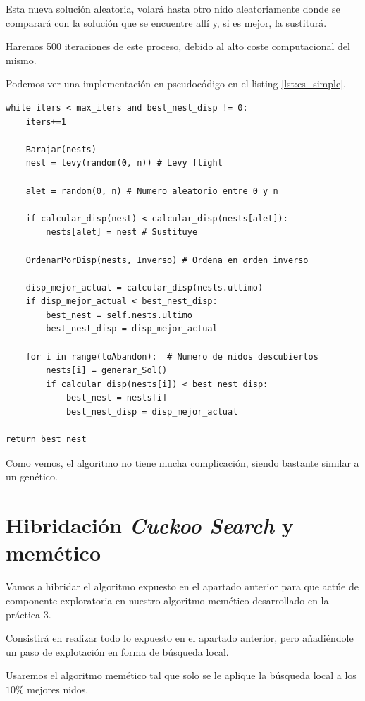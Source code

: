 Esta nueva solución aleatoria, volará hasta otro nido aleatoriamente donde se comparará con la solución que se encuentre allí y, si es mejor, la sustiturá.

Haremos 500 iteraciones de este proceso, debido al alto coste computacional del mismo.

Podemos ver una implementación en pseudocódigo en el listing \ref{lst:cs_simple}.

\begin{lstlisting}[frame=single, caption={Cuckoo search}, captionpos=b, label=lst:cs_simple]
while iters < max_iters and best_nest_disp != 0:
    iters+=1

    Barajar(nests)     
    nest = levy(random(0, n)) # Levy flight

    alet = random(0, n) # Numero aleatorio entre 0 y n

    if calcular_disp(nest) < calcular_disp(nests[alet]):
        nests[alet] = nest # Sustituye
    
    OrdenarPorDisp(nests, Inverso) # Ordena en orden inverso

    disp_mejor_actual = calcular_disp(nests.ultimo)
    if disp_mejor_actual < best_nest_disp:
        best_nest = self.nests.ultimo
        best_nest_disp = disp_mejor_actual

    for i in range(toAbandon):	# Numero de nidos descubiertos
        nests[i] = generar_Sol()
        if calcular_disp(nests[i]) < best_nest_disp:
            best_nest = nests[i]
            best_nest_disp = disp_mejor_actual
            
return best_nest
\end{lstlisting}

Como vemos, el algoritmo no tiene mucha complicación, siendo bastante similar a un genético.

\newpage

\section{Hibridación \textit{Cuckoo Search} y memético}

Vamos a hibridar el algoritmo expuesto en el apartado anterior para que actúe de componente exploratoria en nuestro algoritmo memético desarrollado en la práctica 3.

Consistirá en realizar todo lo expuesto en el apartado anterior, pero añadiéndole un paso de explotación en forma de búsqueda local.

Usaremos el algoritmo memético tal que solo se le aplique la búsqueda local a los $10\%$ mejores nidos.

